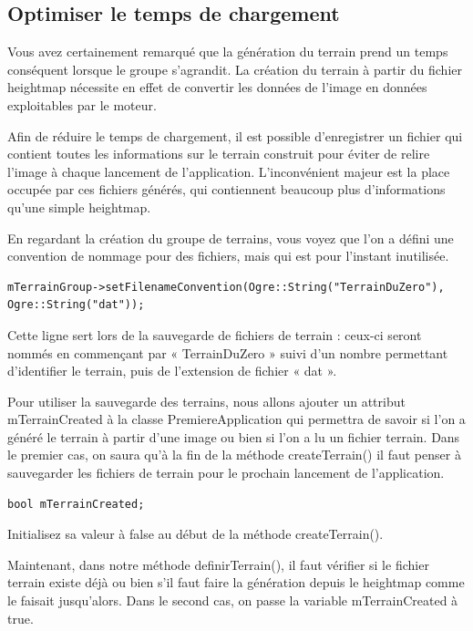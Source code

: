 \documentclass[10pt,a4paper]{report}
\begin{document}
\subsection{Optimiser le temps de chargement}

Vous avez certainement remarqu\'e que la g\'en\'eration du terrain prend un temps cons\'equent lorsque le groupe s'agrandit. La cr\'eation du terrain \`a partir du fichier heightmap n\'ecessite en effet de convertir les donn\'ees de l'image en donn\'ees exploitables par le moteur.

Afin de r\'eduire le temps de chargement, il est possible d'enregistrer un fichier qui contient toutes les informations sur le terrain construit pour \'eviter de relire l'image \`a chaque lancement de l'application. L'inconv\'enient majeur est la place occup\'ee par ces fichiers g\'en\'er\'es, qui contiennent beaucoup plus d'informations qu'une simple heightmap.

En regardant la cr\'eation du groupe de terrains, vous voyez que l'on a d\'efini une convention de nommage pour des fichiers, mais qui est pour l'instant inutilis\'ee.

\begin{lstlisting}[caption={}]
mTerrainGroup->setFilenameConvention(Ogre::String("TerrainDuZero"), Ogre::String("dat"));
\end{lstlisting}

Cette ligne sert lors de la sauvegarde de fichiers de terrain : ceux-ci seront nomm\'es en commençant par « TerrainDuZero » suivi d'un nombre permettant d'identifier le terrain, puis de l'extension de fichier « dat ».

Pour utiliser la sauvegarde des terrains, nous allons ajouter un attribut mTerrainCreated \`a la classe PremiereApplication qui permettra de savoir si l'on a g\'en\'er\'e le terrain \`a partir d'une image ou bien si l'on a lu un fichier terrain. Dans le premier cas, on saura qu'\`a la fin de la m\'ethode createTerrain() il faut penser \`a sauvegarder les fichiers de terrain pour le prochain lancement de l'application.

\begin{lstlisting}[caption={}]
bool mTerrainCreated;
\end{lstlisting}

Initialisez sa valeur \`a false au d\'ebut de la m\'ethode createTerrain().

Maintenant, dans notre m\'ethode definirTerrain(), il faut v\'erifier si le fichier terrain existe d\'ej\`a ou bien s'il faut faire la g\'en\'eration depuis le heightmap comme le faisait jusqu'alors. Dans le second cas, on passe la variable mTerrainCreated \`a true.
\end{document}
